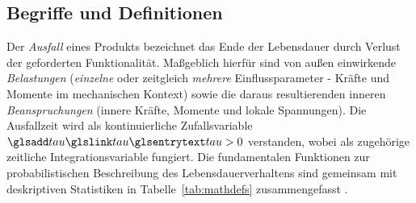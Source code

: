 
\subsection{Begriffe und Definitionen} \label{subsec:begriffezuv}
Der \textit{Ausfall} eines Produkts bezeichnet das Ende der Lebensdauer durch Verlust der geforderten Funktionalität.
Maßgeblich hierfür sind  von außen einwirkende \textit{Belastungen} (\textit{einzelne} oder zeitgleich \textit{mehrere} Einflussparameter - Kräfte und Momente im mechanischen Kontext) sowie die daraus resultierenden inneren \textit{Beanspruchungen} (innere Kräfte, Momente und lokale Spannungen).
Die Ausfallzeit wird als kontinuierliche Zufallsvariable $\sym{tau}>0$ verstanden, wobei  als zugehörige zeitliche Integrationsvariable fungiert.
Die fundamentalen Funktionen zur probabilistischen Beschreibung des Lebensdauerverhaltens sind gemeinsam mit deskriptiven Statistiken in Tabelle~\ref{tab:mathdefs} zusammengefasst \cite{Bertsche.2022,Meeker.2022,Birolini.2017}.


